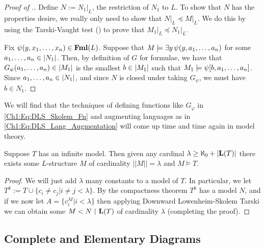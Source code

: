 \begin{proof}[Proof of .]
    Define $N := N_1\vert_{L}$, the restriction of $N_1$ to $L$. To show that $N$ has the properties desire, we really only need to show that $N\vert_L \preceq M \vert_L$. We do this by using the Tarski-Vaught test () to prove that $M_1\vert_{L} \preceq N_1\vert_{L}$.

    Fix $\psi\!\left( y, x_1, \ldots, x_n \right) \in \mathbf{Fml}(L)$. Suppose that $M \models \exists y \, \psi\!\left( y, a_1, \ldots, a_n \right)$ for some $a_1, \ldots, a_n \in \left\lvert N_1 \right\rvert$. Then, by definition of $G$ for formulae, we have that $G_{\psi}\!\left( a_1, \ldots, a_n \right) \in \left\lvert M_1 \right\rvert$ is the smallest $b \in \left\lvert M_1 \right\rvert$ such that $M_1 \models \psi\!\left[ b, a_1, \ldots, a_n \right]$. Since $a_1, \ldots, a_n \in \left\lvert N_1 \right\rvert$, and since $N$ is closed under taking $G_{\psi}$, we must have $b \in N_1$.
    
\end{proof}

We will find that the techniques of defining functions like $G_{\varphi}$ in \eqref{Ch1:Eq:DLS_Skolem_Fn} and augmenting languages as in \eqref{Ch1:Eq:DLS_Lang_Augmentation} will come up time and time again in model theory.

\begin{boxtheorem}
    Suppose $T$ has an infinite model. Then given any cardinal $\lambda \geq \aleph_0+|\mathbf{L}(T)|$ there exists some $L$-structure $M$ of cardinality $||M||=\lambda$ and $M\models T$.
\end{boxtheorem}

\begin{proof}
    We will just add $\lambda$ many constants to a model of $T$. In particular, we let $T^k:=T\cup\{c_i\neq c_j|i\neq j<\lambda\}$. By the compactness theorem $T^k$ has a model $N$, and if we now let $A=\{c_i^M| i<\lambda\}$ then applying Downward Lowenheim-Skolem Tarski we can obtain some $M<N\restriction \mathbf{L}(T)$ of cardinality $\lambda$ (completing the proof).
\end{proof}

\subsection{Complete and Elementary Diagrams}

